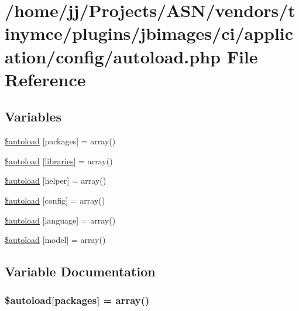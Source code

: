 \hypertarget{autoload_8php}{}\section{/home/jj/\+Projects/\+A\+S\+N/vendors/tinymce/plugins/jbimages/ci/application/config/autoload.php File Reference}
\label{autoload_8php}
\subsection*{Variables}
\begin{DoxyCompactItemize}
\item 
\hyperlink{autoload_8php_ab562c5bbb18f14d6b6b7014d9166625d}{\$autoload} \mbox{[}\textquotesingle{}packages\textquotesingle{}\mbox{]} = array()
\item 
\hyperlink{autoload_8php_ab86d0a1a62e12b528eacaa7100bc4d93}{\$autoload} \mbox{[}\textquotesingle{}\hyperlink{libraries_8php_a0b2688fe4e942da712de62754d0efdc8}{libraries}\textquotesingle{}\mbox{]} = array()
\item 
\hyperlink{autoload_8php_aa98014ce8ad854ad9500e65ff159272d}{\$autoload} \mbox{[}\textquotesingle{}helper\textquotesingle{}\mbox{]} = array()
\item 
\hyperlink{autoload_8php_ac051887e192979c0320e05821bad8f33}{\$autoload} \mbox{[}\textquotesingle{}config\textquotesingle{}\mbox{]} = array()
\item 
\hyperlink{autoload_8php_addfee4f4b38a8235172cb173995a9c0b}{\$autoload} \mbox{[}\textquotesingle{}language\textquotesingle{}\mbox{]} = array()
\item 
\hyperlink{autoload_8php_a942b884082b1defda7fb10ee71bba324}{\$autoload} \mbox{[}\textquotesingle{}model\textquotesingle{}\mbox{]} = array()
\end{DoxyCompactItemize}


\subsection{Variable Documentation}
\subsubsection[{\texorpdfstring{\$autoload}{$autoload}}]{\setlength{\rightskip}{0pt plus 5cm}\$autoload\mbox{[}\textquotesingle{}packages\textquotesingle{}\mbox{]} = array()}\hypertarget{autoload_8php_ab562c5bbb18f14d6b6b7014d9166625d}{}\label{autoload_8php_ab562c5bbb18f14d6b6b7014d9166625d}


